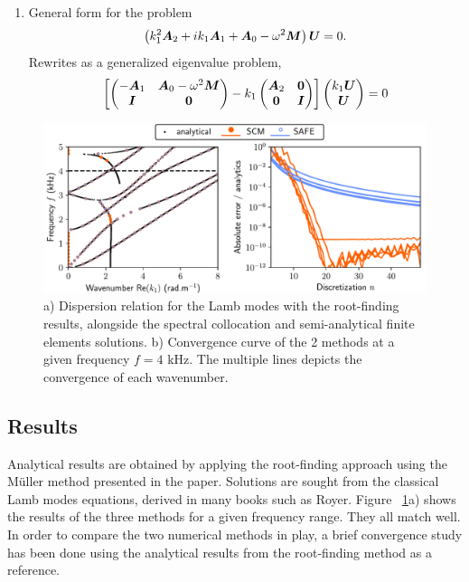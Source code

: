 \begin{enumerate}
\item General form for the problem
\begin{equation}
    \left( k_1^2 \boldsymbol A_2 + ik_1 \boldsymbol A_1 + \boldsymbol A_0 - \omega^2 \boldsymbol M \right) \boldsymbol U = 0.
\end{equation}
Rewrites as a generalized eigenvalue problem,
\begin{equation}
    \left[\begin{pmatrix}
         -\boldsymbol A_1 & \boldsymbol A_0 - \omega^2\boldsymbol  M\\
         \boldsymbol I & \boldsymbol 0 
    \end{pmatrix} - k_1 \begin{pmatrix}
        \boldsymbol A_2 & \boldsymbol 0\\ \boldsymbol 0 & \boldsymbol I 
    \end{pmatrix}\right] \begin{pmatrix}
        k_1 \boldsymbol U \\ \boldsymbol U 
    \end{pmatrix} = 0
\end{equation}
\end{enumerate}


\begin{figure}[ht!]
    \centering
    \includegraphics{./chapitres/annexes/figs/figure.pdf}
    \caption{a) Dispersion relation for the Lamb modes with the root-finding results, alongside the spectral collocation and semi-analytical finite elements solutions. b) Convergence curve of the 2 methods at a given frequency $f=4$ kHz. The multiple lines depicts the convergence of each wavenumber.}
    \label{fig:conv_scm_safe_lamb}
\end{figure}

\subsection{Results}
Analytical results are obtained by applying the root-finding approach using the Müller method presented in the paper. Solutions are sought from the classical Lamb modes equations, derived in many books such as Royer. Figure ~\ref{fig:conv_scm_safe_lamb}a) shows the results of the three methods for a given frequency range. They all match well. In order to compare the two numerical methods in play, a brief convergence study has been done using the analytical results from the root-finding method as a reference. 

